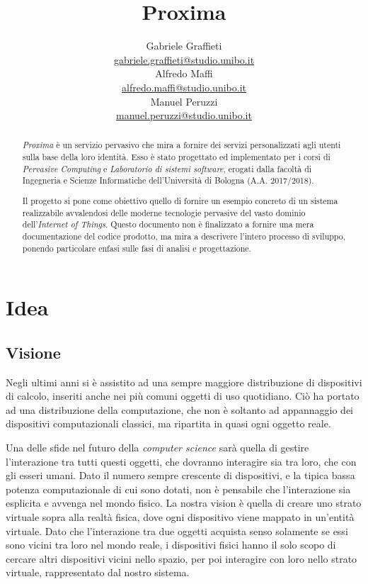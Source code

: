 \documentclass[a4paper,12pt]{report}
\title{\Huge \textbf{Proxima} \\
	\vspace{10pt}
	\vspace{20pt}
}
\author{
	Gabriele Graffieti \\ \small \url{gabriele.graffieti@studio.unibo.it}
	\vspace{15pt}
	\\
	Alfredo Maffi \\ \small \url{alfredo.maffi@studio.unibo.it}
	\vspace{15pt}
	\\
	Manuel Peruzzi \\ \small \url{manuel.peruzzi@studio.unibo.it}
}
\date{}
\begin{document}
\maketitle
{}

\begin{abstract}
	\emph{Proxima} è un servizio pervasivo che mira a fornire dei servizi personalizzati agli utenti sulla base della loro identità. Esso è stato progettato ed implementato per i corsi di \emph{Pervasive Computing} e \emph{Laboratorio di sistemi software}, erogati dalla facoltà di Ingegneria e Scienze Informatiche dell'Università di Bologna (A.A. 2017/2018).
	
	Il progetto si pone come obiettivo quello di fornire un esempio concreto di un sistema realizzabile avvalendosi delle moderne tecnologie pervasive del vasto dominio dell'\emph{Internet of Things}. Questo documento non è finalizzato a fornire una mera documentazione del codice prodotto, ma mira a descrivere l'intero processo di sviluppo, ponendo particolare enfasi sulle fasi di analisi e progettazione. 
\end{abstract}

\tableofcontents

\chapter{Idea}
\section{Visione} \label{vision}
Negli ultimi anni si è assistito ad una sempre maggiore distribuzione di dispositivi di calcolo, inseriti anche nei più comuni oggetti di uso quotidiano. Ciò ha portato ad una distribuzione della computazione, che non è soltanto ad appannaggio dei dispositivi computazionali classici, ma ripartita in quasi ogni oggetto reale. 

Una delle sfide nel futuro della \emph{computer science} sarà quella di gestire l'interazione tra tutti questi oggetti, che dovranno interagire sia tra loro, che con gli esseri umani. Dato il numero sempre crescente di dispositivi, e la tipica bassa potenza computazionale di cui sono dotati, non è pensabile che l'interazione sia esplicita e avvenga nel mondo fisico. La nostra vision è quella di creare uno strato virtuale sopra alla realtà fisica, dove ogni dispositivo viene mappato in un'entità virtuale. Dato che l'interazione tra due oggetti acquista senso solamente se essi sono vicini tra loro nel mondo reale, i dispositivi fisici hanno il solo scopo di cercare altri dispositivi vicini nello spazio, per poi interagire con loro nello strato virtuale, rappresentato dal nostro sistema. 
\end{document}

